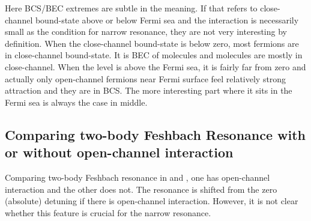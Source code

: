 Here BCS/BEC extremes are subtle in the meaning.  If that refers to close-channel bound-state above or below Fermi sea and the interaction is necessarily small as the condition for narrow resonance, they are not very interesting by definition.  When the close-channel bound-state is below zero, most fermions are in close-channel bound-state.  It is BEC of molecules and molecules are mostly in close-channel. When the level is above the Fermi sea, it is fairly far from zero and actually only open-channel fermions near Fermi surface feel relatively strong attraction and they are in BCS.  The more interesting part where it sits in the Fermi sea is always the  case in middle.  

\subsection{Comparing two-body Feshbach Resonance with or without open-channel interaction }
Comparing two-body Feshbach resonance in \cite{Leggett} and \cite{GurarieNarrow}, one has open-channel interaction and the other does not.  The resonance is shifted from the zero (absolute) detuning if there is open-channel interaction.  However, it is not clear whether this feature is crucial for the narrow resonance.   

